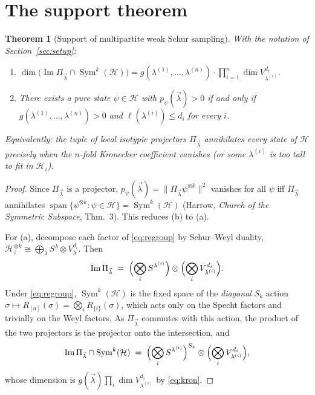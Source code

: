 \documentclass[11pt]{article}
\newtheorem{theorem}{Theorem}
\theoremstyle{definition}
\theoremstyle{remark}
\newcommand{\bmlam}{\vec{\lambda}}
\newcommand{\Sym}{\operatorname{Sym}}
\newcommand{\Imm}{\operatorname{Im}}
\newcommand{\Hil}{\mathcal{H}}
\begin{document}
\section{The support theorem}
\label{sec:support}

\begin{theorem}[Support of multipartite weak Schur sampling]
\label{thm:support}
With the notation of Section~\ref{sec:setup}:
\begin{enumerate}
  \item[(a)] $\displaystyle
    \dim\bigl( \Imm \Pi_{\bmlam} \cap \Sym^k(\Hil) \bigr)
      = g(\lambda^{(1)},\dots,\lambda^{(n)}) \cdot
        \prod_{i=1}^n \dim V^{d_i}_{\lambda^{(i)}} .$
  \item[(b)] There exists a pure state $\psi \in \Hil$ with $p_\psi(\bmlam) > 0$ if and
    only if $g(\lambda^{(1)},\dots,\lambda^{(n)}) > 0$ and $\ell(\lambda^{(i)}) \le d_i$
    for every $i$.
\end{enumerate}
Equivalently: the tuple of local isotypic projectors $\Pi_{\bmlam}$ annihilates
\emph{every} state of $\Hil$ precisely when the $n$-fold Kronecker coefficient
vanishes (or some $\lambda^{(i)}$ is too tall to fit in $\Hil_i$).
\end{theorem}

\begin{proof}
Since $\Pi_{\bmlam}$ is a projector, $p_\psi(\bmlam) = \|\Pi_{\bmlam}\psi^{\otimes k}\|^2$
vanishes for all $\psi$ iff $\Pi_{\bmlam}$ annihilates
$\operatorname{span}\{\psi^{\otimes k} : \psi \in \Hil\} = \Sym^k(\Hil)$
(Harrow, \emph{Church of the Symmetric Subspace}, Thm.~3). This reduces (b) to (a).

For (a), decompose each factor of \eqref{eq:regroup} by Schur--Weyl duality,
$\Hil_i^{\otimes k} \cong \bigoplus_{\lambda} S^{\lambda} \otimes V^{d_i}_{\lambda}$.
Then
\[
  \Imm \Pi_{\bmlam}
   \;=\; \Bigl( \bigotimes_i S^{\lambda^{(i)}} \Bigr)
         \otimes \Bigl( \bigotimes_i V^{d_i}_{\lambda^{(i)}} \Bigr).
\]
Under \eqref{eq:regroup}, $\Sym^k(\Hil)$ is the fixed space of the \emph{diagonal}
$S_k$ action $\sigma \mapsto R_{[n]}(\sigma) = \bigotimes_i R_{\{i\}}(\sigma)$, which
acts only on the Specht factors and trivially on the Weyl factors. As $\Pi_{\bmlam}$
commutes with this action, the product of the two projectors is the projector onto the
intersection, and
\[
  \Imm \Pi_{\bmlam} \cap \Sym^k(\Hil)
   \;=\; \Bigl( \bigotimes_i S^{\lambda^{(i)}} \Bigr)^{S_k}
         \otimes \Bigl( \bigotimes_i V^{d_i}_{\lambda^{(i)}} \Bigr),
\]
whose dimension is $g(\bmlam)\prod_i \dim V^{d_i}_{\lambda^{(i)}}$ by \eqref{eq:kron}.
\end{proof}
\end{document}
